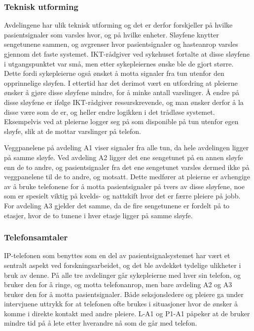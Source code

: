\subsubsection{Teknisk utforming}
Avdelingene har ulik teknisk utforming og det er derfor forskjeller på hvilke pasientsignaler som varsles hvor, og på hvilke enheter. Sløyfene knytter sengetunene sammen, og avgrenser hvor pasientsignaler og hasteanrop varsles gjennom det faste systemet. IKT-rådgiver ved sykehuset fortalte at disse sløyfene i utgangspunktet var små, men etter sykepleiernes ønske ble de gjort større. Dette fordi sykepleierne også ønsket å motta signaler fra tun utenfor den opprinnelige sløyfen. I ettertid har det derimot vært en utfordring at pleierne ønsker å gjøre disse sløyfene mindre, for å minke antall varslinger. Å endre på disse sløyfene er ifølge IKT-rådgiver ressurskrevende, og man ønsker derfor å la disse være som de er, og heller endre logikken i det trådløse systemet. Eksempelvis ved at pleierne logger seg på som disponible på tun utenfor egen sløyfe, slik at de mottar varslinger på telefon.

\noindent
Veggpanelene på avdeling A1 viser signaler fra alle tun, da hele avdelingen ligger på samme sløyfe. Ved avdeling A2 ligger det ene sengetunet på en annen sløyfe enn de to andre, og pasientsignaler fra det ene sengetunet varsles dermed ikke på veggpanelene til de to andre, og motsatt. Dette medfører at pleierne er avhengige av å bruke telefonene for å motta pasientsignaler på tvers av disse sløyfene, noe som er spesielt viktig på kvelds- og nattskift hvor det er færre pleiere på jobb. For avdeling A3 gjelder det samme, da de fire sengetunene er fordelt på to etasjer, hvor de to tunene i hver etasje ligger på samme sløyfe.

\subsubsection{Telefonsamtaler}
IP-telefonen som benyttes som en del av pasientsignalsystemet har vært et sentralt aspekt ved forskningsarbeidet, og det ble avdekket tydelige ulikheter i bruk av denne. På alle tre avdelinger går sykepleierne med hver sin telefon, og bruker den for å ringe, og motta telefonanrop, men bare avdeling A2 og A3 bruker den for å motta pasientsignaler. Både seksjonsledere og pleiere ga under intervjuene uttrykk for at telefonen ofte brukes i situasjoner hvor de ønsker å komme i direkte kontakt med andre pleiere. L-A1 og P1-A1 påpeker at de bruker mindre tid på å lete etter hverandre nå som de går med telefon.   

